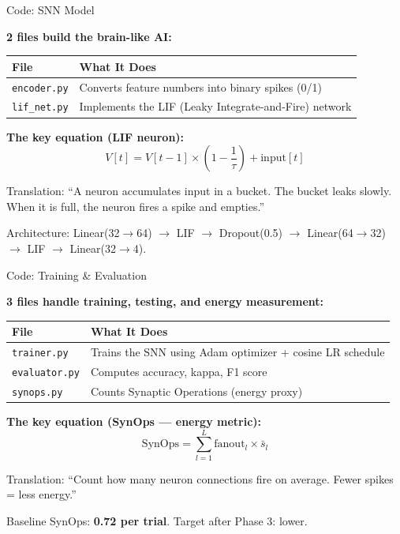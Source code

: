 \documentclass[10pt]{beamer}
\begin{document}
\begin{frame}{Code: SNN Model}

\small
\textbf{2 files build the brain-like AI:}

\vspace{4pt}
\begin{tabular}{ll}
\toprule
\textbf{File} & \textbf{What It Does} \\
\midrule
\texttt{encoder.py} & Converts feature numbers into binary spikes (0/1) \\
\texttt{lif_net.py} & Implements the LIF (Leaky Integrate-and-Fire) network \\
\bottomrule
\end{tabular}

\vspace{6pt}
\textbf{The key equation (LIF neuron):}
\vspace{-2pt}
\[
V[t] = V[t\!-\!1] \times \left(1 - \frac{1}{\tau}\right) + \text{input}[t]
\]

\vspace{-4pt}
Translation: ``A neuron accumulates input in a bucket. The bucket leaks slowly. When it is full, the neuron fires a spike and empties.''

\vspace{4pt}
Architecture: Linear(32$\to$64) $\to$ LIF $\to$ Dropout(0.5) $\to$ Linear(64$\to$32) $\to$ LIF $\to$ Linear(32$\to$4).

\end{frame}

\begin{frame}{Code: Training \& Evaluation}

\small
\textbf{3 files handle training, testing, and energy measurement:}

\vspace{4pt}
\begin{tabular}{ll}
\toprule
\textbf{File} & \textbf{What It Does} \\
\midrule
\texttt{trainer.py} & Trains the SNN using Adam optimizer + cosine LR schedule \\
\texttt{evaluator.py} & Computes accuracy, kappa, F1 score \\
\texttt{synops.py} & Counts Synaptic Operations (energy proxy) \\
\bottomrule
\end{tabular}

\vspace{6pt}
\textbf{The key equation (SynOps --- energy metric):}
\vspace{-2pt}
\[
\text{SynOps} = \sum_{l=1}^{L} \text{fanout}_l \times \bar{s}_l
\]

\vspace{-4pt}
Translation: ``Count how many neuron connections fire on average. Fewer spikes = less energy.''

\vspace{4pt}
Baseline SynOps: \textbf{0.72 per trial}. Target after Phase 3: lower.

\end{frame}
\end{document}
